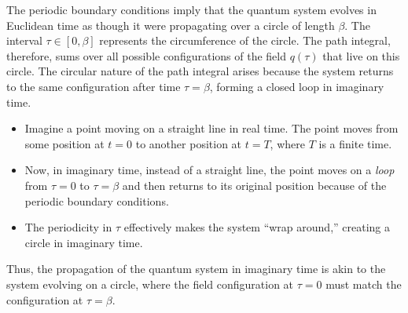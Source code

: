 \begin{enumerate}
    The periodic boundary conditions imply that the quantum system evolves in Euclidean time as though it were propagating over a circle of length $\beta$. The interval $\tau \in [0, \beta]$ represents the circumference of the circle. The path integral, therefore, sums over all possible configurations of the field $q(\tau)$ that live on this circle. The circular nature of the path integral arises because the system returns to the same configuration after time $\tau = \beta$, forming a closed loop in imaginary time.
    \begin{itemize}
        \item Imagine a point moving on a straight line in real time. The point moves from some position at $t = 0$ to another position at $t = T$, where $T$ is a finite time.
        \item Now, in imaginary time, instead of a straight line, the point moves on a \textit{loop} from $\tau = 0$ to $\tau = \beta$ and then returns to its original position because of the periodic boundary conditions.
        \item The periodicity in $\tau$ effectively makes the system “wrap around,” creating a circle in imaginary time.
    \end{itemize}
    Thus, the propagation of the quantum system in imaginary time is akin to the system evolving on a circle, where the field configuration at $\tau = 0$ must match the configuration at $\tau = \beta$.
    

\end{enumerate}
